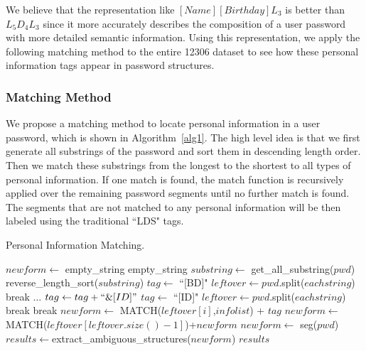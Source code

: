 We believe that the representation like $[Name][Birthday]L_3$ is
better than $L_5D_4L_3$ since it more accurately describes the
composition of a user password with more detailed semantic
information. Using this representation, we apply the following
matching method to the entire 12306 dataset to see how these personal
information tags appear in password structures.

\subsubsection{Matching Method}
\label{matchingmethod}

We propose a matching method to locate personal information in a
user password, which is shown in Algorithm~\ref{alg1}. The high level idea
is that we first generate all substrings of the password and sort them
in descending length order. Then we match these substrings from the
longest to the shortest to all types of personal information.  If one
match is found, the match function is recursively applied over the
remaining password segments until no further match is found. The
segments that are not matched to any personal information will be then
labeled using the traditional ``LDS" tags.


\begin{algorithm}[h!]
\caption{Personal Information Matching.}
\label{alg1}
\begin{algorithmic}[1]
\State $newform \gets$ empty\_string
\State \Return empty\_string
\EndIf
\State $substring \gets$ get\_all\_substring($pwd$)
\State reverse\_length\_sort($substring$)
\State $tag \gets $ ``[BD]"
\State $leftover \gets pwd$.split($eachstring$)
\State break
\EndIf
\State $\ldots$
\State $tag \gets tag + ``\&[ID]"$
\Else
\State $tag \gets$ ``[ID]"
\EndIf
\State $leftover \gets pwd$.split($eachstring$)
\State break
\EndIf
\Else
\State break
\EndIf
\EndFor
{}
\State $newform \gets$ MATCH($leftover[i]$,$infolist$) + $tag$
\EndFor
\State $newform \gets$  MATCH($leftover[leftover.size()-1]$)+$newform$
\Else
\State $newform \gets$ seg($pwd$)
\EndIf
\State $results \gets $extract\_ambiguous\_structures($newform$)
\State \Return $results$
\EndProcedure
\end{algorithmic}
\end{algorithm}



